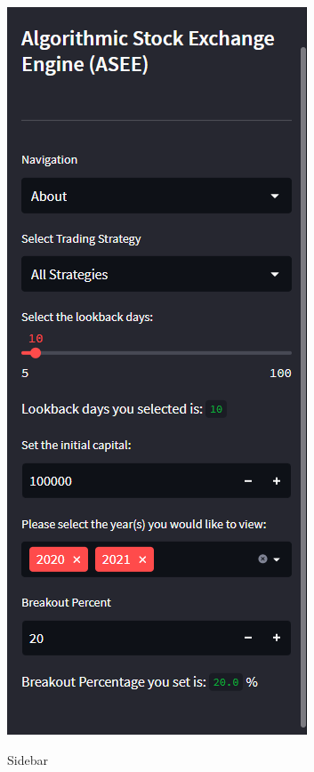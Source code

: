 \begin{figure}[ht]
\begin{minipage}[b]{0.35\textwidth}
        \includegraphics[width=\textwidth]{Images/sidebar.png}
        \label{fig:image2}
    \end{minipage}
    \caption{Sidebar}
    \label{fig:bothimages}
\end{figure}

